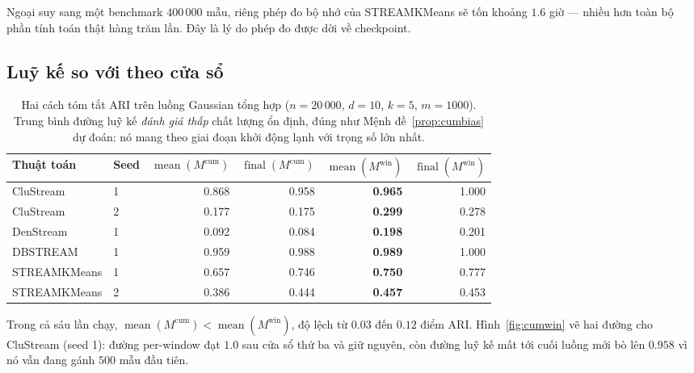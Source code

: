 \documentclass[11pt,a4paper]{article}
\theoremstyle{remark}
\begin{document}
Ngoại suy sang một benchmark $400\,000$ mẫu, riêng phép đo bộ nhớ của
STREAMKMeans sẽ tốn khoảng $1.6$ giờ --- nhiều hơn toàn bộ phần tính toán thật
hàng trăm lần. Đây là lý do phép đo được dời về checkpoint.

\subsection{Luỹ kế so với theo cửa sổ}
\label{sec:cumwin-res}

\begin{table}[htbp]
\centering
\small
\caption{Hai cách tóm tắt ARI trên luồng Gaussian tổng hợp
($n=20\,000$, $d=10$, $k=5$, $m=1000$). Trung bình đường luỹ kế \emph{đánh giá
thấp} chất lượng ổn định, đúng như Mệnh đề~\ref{prop:cumbias} dự đoán: nó mang
theo giai đoạn khởi động lạnh với trọng số lớn nhất.}
\label{tab:cumwin}
\begin{tabular}{@{}llrrrr@{}}
\toprule
\textbf{Thuật toán} & \textbf{Seed}
 & $\operatorname{mean}(M^{\mathrm{cum}})$ & $\operatorname{final}(M^{\mathrm{cum}})$
 & $\operatorname{mean}(M^{\mathrm{win}})$ & $\operatorname{final}(M^{\mathrm{win}})$ \\
\midrule
CluStream     & 1 & 0.868 & 0.958 & \textbf{0.965} & 1.000 \\
CluStream     & 2 & 0.177 & 0.175 & \textbf{0.299} & 0.278 \\
DenStream     & 1 & 0.092 & 0.084 & \textbf{0.198} & 0.201 \\
DBSTREAM      & 1 & 0.959 & 0.988 & \textbf{0.989} & 1.000 \\
STREAMKMeans  & 1 & 0.657 & 0.746 & \textbf{0.750} & 0.777 \\
STREAMKMeans  & 2 & 0.386 & 0.444 & \textbf{0.457} & 0.453 \\
\bottomrule
\end{tabular}
\end{table}

Trong cả sáu lần chạy, $\operatorname{mean}(M^{\mathrm{cum}}) <
\operatorname{mean}(M^{\mathrm{win}})$, độ lệch từ $0.03$ đến $0.12$ điểm ARI.
Hình~\ref{fig:cumwin} vẽ hai đường cho CluStream (seed 1): đường per-window đạt
$1.0$ sau cửa sổ thứ ba và giữ nguyên, còn đường luỹ kế mất tới cuối luồng mới
bò lên $0.958$ vì nó vẫn đang gánh $500$ mẫu đầu tiên.
\end{document}

